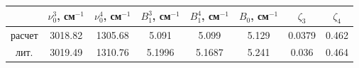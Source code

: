 \documentclass[14pt]{extarticle}
\begin{document}
\begin{table}[!hf]
	\centering	
	\begin{tabular}{|c|c|c|c|c|c|c|c|}
		\hline		
	& $\nu_0^3$, см$^{-1}$ & $\nu_0^4$, см$^{-1}$ & $B_1^3$, см$^{-1}$ & $B_1^4$, см$^{-1}$ & $B_0$, см$^{-1}$ & $\zeta_3$ & $\zeta_4$ \\
		\hline 
	расчет & 3018.82 & 1305.68 & 5.091 & 5.099 & 5.129 & 0.0379 & 0.462 \\
	лит. & 3019.49 & 1310.76 & 5.1996 & 5.1687 & 5.241 & 0.036 & 0.464 \\
	\hline
	\end{tabular}
\end{table}
\end{document}
